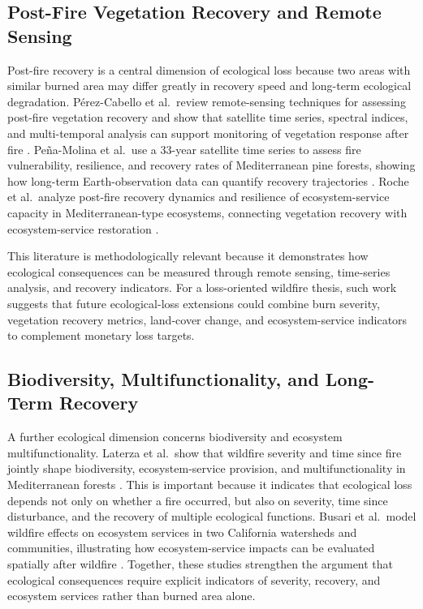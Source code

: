 \subsection{Post-Fire Vegetation Recovery and Remote Sensing}

Post-fire recovery is a central dimension of ecological loss because two areas with similar burned area may differ greatly in recovery speed and long-term ecological degradation. P\'erez-Cabello et al.\ review remote-sensing techniques for assessing post-fire vegetation recovery and show that satellite time series, spectral indices, and multi-temporal analysis can support monitoring of vegetation response after fire \citep{perezcabello2021postfire}. Pe\~na-Molina et al.\ use a 33-year satellite time series to assess fire vulnerability, resilience, and recovery rates of Mediterranean pine forests, showing how long-term Earth-observation data can quantify recovery trajectories \citep{penamolina2024recovery}. Roche et al.\ analyze post-fire recovery dynamics and resilience of ecosystem-service capacity in Mediterranean-type ecosystems, connecting vegetation recovery with ecosystem-service restoration \citep{roche2024postfire}.

This literature is methodologically relevant because it demonstrates how ecological consequences can be measured through remote sensing, time-series analysis, and recovery indicators. For a loss-oriented wildfire thesis, such work suggests that future ecological-loss extensions could combine burn severity, vegetation recovery metrics, land-cover change, and ecosystem-service indicators to complement monetary loss targets.

\subsection{Biodiversity, Multifunctionality, and Long-Term Recovery}

A further ecological dimension concerns biodiversity and ecosystem multifunctionality. Laterza et al.\ show that wildfire severity and time since fire jointly shape biodiversity, ecosystem-service provision, and multifunctionality in Mediterranean forests \citep{laterza2026multifunctionality}. This is important because it indicates that ecological loss depends not only on whether a fire occurred, but also on severity, time since disturbance, and the recovery of multiple ecological functions. Busari et al.\ model wildfire effects on ecosystem services in two California watersheds and communities, illustrating how ecosystem-service impacts can be evaluated spatially after wildfire \citep{busari2025ecosystemservices}. Together, these studies strengthen the argument that ecological consequences require explicit indicators of severity, recovery, and ecosystem services rather than burned area alone.

